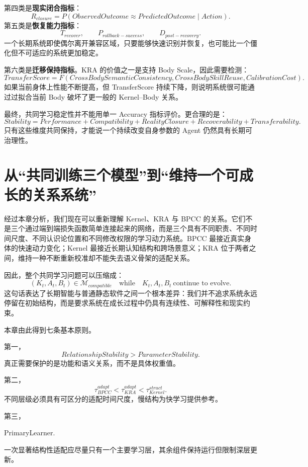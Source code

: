 第四类是\textbf{现实闭合指标}：
\[
R_{closure}
=
P
\left(
ObservedOutcome
\approx
PredictedOutcome
\mid
Action
\right).
\]
第五类是\textbf{恢复能力指标}：
\[
T_{recover},
\qquad
P_{rollback-success},
\qquad
D_{post-recovery}.
\]
一个长期系统即使偶尔离开兼容区域，只要能够快速识别并恢复，也可能比一个僵化但不可适应的系统更加稳定。

第六类是\textbf{迁移保持指标}。KRA 的价值之一是支持 Body Scale，因此需要检测：
\[
TransferScore
=
F
\left(
CrossBodySemanticConsistency,
CrossBodySkillReuse,
CalibrationCost
\right).
\]
如果当前身体上性能不断提高，但 TransferScore 持续下降，则说明系统很可能通过过拟合当前 Body 破坏了更一般的 Kernel--Body 关系。

最终，共同学习稳定性并不能用单一 Accuracy 指标评价。更合理的是：
\[
\boxed{
Stability
=
Performance
+
Compatibility
+
RealityClosure
+
Recoverability
+
Transferability.
}
\]
只有这些维度共同保持，才能说一个持续改变自身参数的 Agent 仍然具有长期可治理性。

\section{从“共同训练三个模型”到“维持一个可成长的关系系统”}

经过本章分析，我们现在可以重新理解 Kernel、KRA 与 BPCC 的关系。它们不是三个通过端到端损失函数简单连接起来的网络，而是三个具有不同职责、不同时间尺度、不同认识论位置和不同修改权限的学习动力系统。BPCC 最接近真实身体的快速动力变化；Kernel 最接近长期认知结构和跨场景意义；KRA 位于两者之间，维持一种不断重新校准却不能失去语义骨架的适配关系。

因此，整个共同学习问题可以压缩成：
\[
\boxed{
(K_t,A_t,B_t)\in
\mathcal M_{compatible}
\quad
\text{while}
\quad
K_t,A_t,B_t
\ \text{continue to evolve}.
}
\]
这句话表达了长期智能与普通静态软件之间一个根本差异：我们并不追求系统永远停留在初始结构，而是要求系统在成长过程中仍具有连续性、可解释性和现实约束。

本章由此得到七条基本原则。

第一，
\[
\boxed{
RelationshipStability>ParameterStability.
}
\]
真正需要保护的是功能和语义关系，而不是具体权重值。

第二，
\[
\boxed{
\tau_{BPCC}^{adapt}
<
\tau_{KRA}^{adapt}
<
\tau_{Kernel}^{struct}.
}
\]
不同层级必须具有可区分的适配时间尺度，慢结构为快学习提供参考。

第三，
\begin{statementbox}
PrimaryLearner.
\end{statementbox}
一次显著结构性适配应尽量只有一个主要学习层，其余组件保持运行但限制深层更新。

